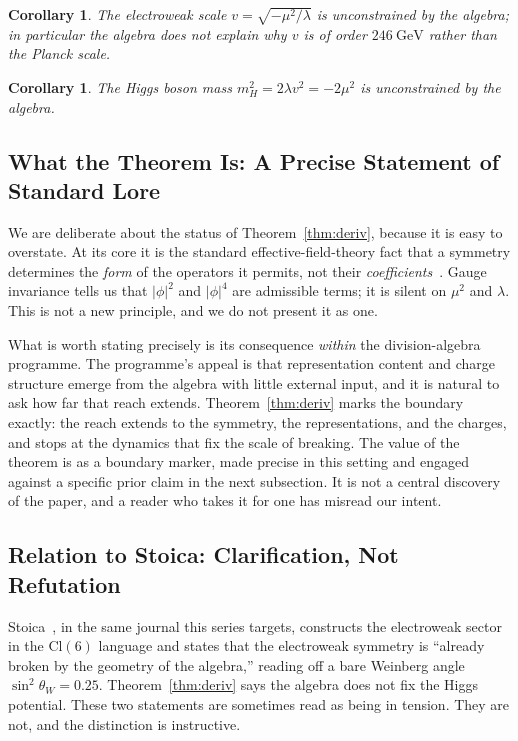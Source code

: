 \documentclass[12pt]{article}
\newtheorem{corollary}[theorem]{Corollary}
\theoremstyle{remark}
\newcommand{\cl}{\mathrm{Cl}}
\begin{document}
\begin{corollary}
	\label{cor:vscale}
	The electroweak scale $v=\sqrt{-\mu^2/\lambda}$ is unconstrained by the
	algebra; in particular the algebra does not explain why $v$ is of order
	$246~\mathrm{GeV}$ rather than the Planck scale.
\end{corollary}

\begin{corollary}
	\label{cor:mhmass}
	The Higgs boson mass $m_H^2=2\lambda v^2=-2\mu^2$ is unconstrained by the
	algebra.
\end{corollary}

\subsection{What the Theorem Is: A Precise Statement of Standard Lore}
\label{sec:deriv-debill}

We are deliberate about the status of Theorem~\ref{thm:deriv}, because it is
easy to overstate.  At its core it is the standard effective-field-theory fact
that a symmetry determines the \emph{form} of the operators it permits, not their
\emph{coefficients}~\cite{Weinberg1995}.  Gauge invariance tells us that
$|\phi|^2$ and $|\phi|^4$ are admissible terms; it is silent on $\mu^2$ and
$\lambda$.  This is not a new principle, and we do not present it as one.

What is worth stating precisely is its consequence \emph{within} the
division-algebra programme.  The programme's appeal is that representation
content and charge structure emerge from the algebra with little external input,
and it is natural to ask how far that reach extends.  Theorem~\ref{thm:deriv}
marks the boundary exactly: the reach extends to the symmetry, the
representations, and the charges, and stops at the dynamics that fix the scale of
breaking.  The value of the theorem is as a boundary marker, made precise in
this setting and engaged against a specific prior claim in the next subsection.
It is not a central discovery of the paper, and a reader who takes it for one has
misread our intent.

\subsection{Relation to Stoica: Clarification, Not Refutation}
\label{sec:deriv-stoica}

Stoica~\cite{Stoica2018}, in the same journal this series targets, constructs
the electroweak sector in the $\cl(6)$ language and states that the electroweak
symmetry is ``already broken by the geometry of the algebra,'' reading off a bare
Weinberg angle $\sin^2\theta_W=0.25$.  Theorem~\ref{thm:deriv} says the algebra
does not fix the Higgs potential.  These two statements are sometimes read as
being in tension.  They are not, and the distinction is instructive.
\end{document}
